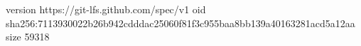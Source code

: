 version https://git-lfs.github.com/spec/v1
oid sha256:7113930022b26b942cdddac25060f81f3c955baa8bb139a40163281acd5a12aa
size 59318
